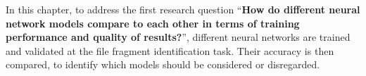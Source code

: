 {\color{red}
In this chapter, to address the first research question ``\textbf{How do different neural network models compare to each other in terms of training performance and quality of results?}'', different neural networks are trained and validated at the file fragment identification task. Their accuracy is then compared, to identify which models should be considered or disregarded.
}